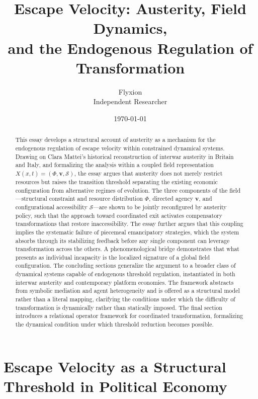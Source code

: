 \documentclass[11pt, a4paper]{article}
\title{\large\textbf{Escape Velocity: Austerity, Field Dynamics,\\and the Endogenous Regulation of Transformation}}
\author{Flyxion\\[0.4em]\small Independent Researcher}
\date{\today}
\begin{document}
\maketitle

\begin{abstract}
This essay develops a structural account of austerity as a mechanism for the endogenous regulation of escape velocity within constrained dynamical systems. Drawing on Clara Mattei's historical reconstruction of interwar austerity in Britain and Italy, and formalizing the analysis within a coupled field representation $X(x,t) = (\Phi, \mathbf{v}, \mathcal{S})$, the essay argues that austerity does not merely restrict resources but raises the transition threshold separating the existing economic configuration from alternative regimes of evolution. The three components of the field---structural constraint and resource distribution $\Phi$, directed agency $\mathbf{v}$, and configurational accessibility $\mathcal{S}$---are shown to be jointly reconfigured by austerity policy, such that the approach toward coordinated exit activates compensatory transformations that restore inaccessibility. The essay further argues that this coupling implies the systematic failure of piecemeal emancipatory strategies, which the system absorbs through its stabilizing feedback before any single component can leverage transformation across the others. A phenomenological bridge demonstrates that what presents as individual incapacity is the localized signature of a global field configuration. The concluding sections generalize the argument to a broader class of dynamical systems capable of endogenous threshold regulation, instantiated in both interwar austerity and contemporary platform economies. The framework abstracts from symbolic mediation and agent heterogeneity and is offered as a structural model rather than a literal mapping, clarifying the conditions under which the difficulty of transformation is dynamically rather than statically imposed. The final section introduces a relational operator framework for coordinated transformation, formalizing the dynamical condition under which threshold reduction becomes possible.
\end{abstract}

\newpage

\section{Escape Velocity as a Structural Threshold in Political Economy}
\end{document}

